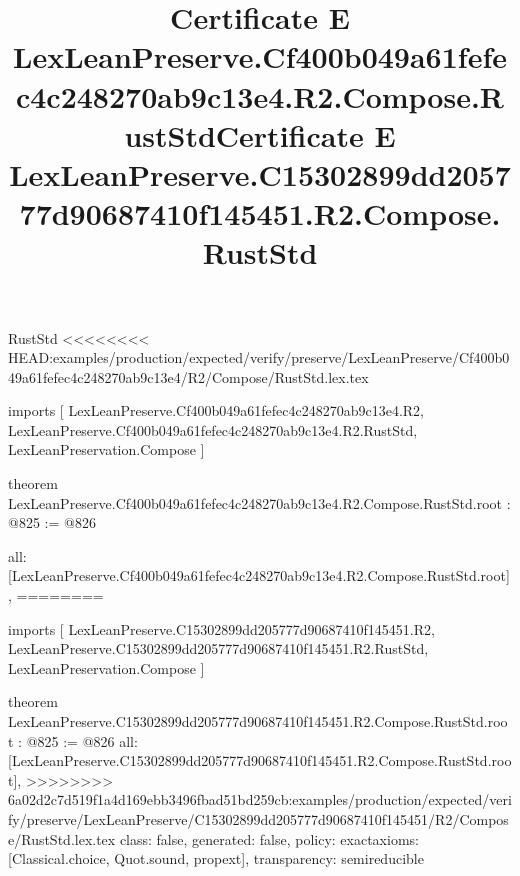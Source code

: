\begin{lexlean}{RustStd}
<<<<<<<< HEAD:examples/production/expected/verify/preserve/LexLeanPreserve/Cf400b049a61fefec4c248270ab9c13e4/R2/Compose/RustStd.lex.tex
\title{Certificate E LexLeanPreserve.Cf400b049a61fefec4c248270ab9c13e4.R2.Compose.RustStd}
\begin{coremodule}
imports [
  LexLeanPreserve.Cf400b049a61fefec4c248270ab9c13e4.R2,
  LexLeanPreserve.Cf400b049a61fefec4c248270ab9c13e4.R2.RustStd,
  LexLeanPreservation.Compose
]

theorem LexLeanPreserve.Cf400b049a61fefec4c248270ab9c13e4.R2.Compose.RustStd.root : @825 := @826 {
  all: [LexLeanPreserve.Cf400b049a61fefec4c248270ab9c13e4.R2.Compose.RustStd.root],
========
\title{Certificate E LexLeanPreserve.C15302899dd205777d90687410f145451.R2.Compose.RustStd}
\begin{coremodule}
imports [
  LexLeanPreserve.C15302899dd205777d90687410f145451.R2,
  LexLeanPreserve.C15302899dd205777d90687410f145451.R2.RustStd,
  LexLeanPreservation.Compose
]

theorem LexLeanPreserve.C15302899dd205777d90687410f145451.R2.Compose.RustStd.root : @825 := @826 {
  all: [LexLeanPreserve.C15302899dd205777d90687410f145451.R2.Compose.RustStd.root],
>>>>>>>> 6a02d2c7d519f1a4d169ebb3496fbad51bd259cb:examples/production/expected/verify/preserve/LexLeanPreserve/C15302899dd205777d90687410f145451/R2/Compose/RustStd.lex.tex
  class: false,
  generated: false,
  policy: exact{axioms: [Classical.choice, Quot.sound, propext]},
  transparency: semireducible
}


\end{coremodule}}
\end{coremodule}
\end{lexlean}
